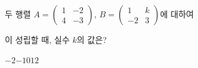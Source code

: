 두 행렬 $A=\begin{pmatrix} 1 & -2 \\ 4 & -3 \end{pmatrix}$, $B=\begin{pmatrix} 1 & k \\ -2 & 3 \end{pmatrix}$에 대하여 \par\smallskip{}\par\smallskip\noindent 이 성립할 때, 실수 $k$의 값은?
\begin{choices32}{$-2$}{$-1$}{$0$}{$1$}{$2$}\end{choices32}
